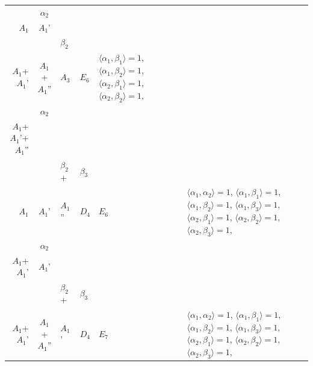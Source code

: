 \documentclass[12pt]{report}
\begin{document}
\begin{appendix}
{\begin{longtable}{rcl p{1cm}p{1cm}p{3cm} }
\begin{tabular}{cc}$\alpha_1$+ & $\alpha_2$\\\tiny{ $A_1$ } & \tiny{ $A_1$' }\end{tabular} &\begin{tabular}{c} = \\~ \end{tabular} & \begin{tabular}{cc}$\beta_1$+ & $\beta_2$\\\tiny{ $A_1$+$A_1$' } & \tiny{ $A_1$+$A_1$'' }\end{tabular} & $A_3$ & $E_6$ &  $\langle\alpha_1, \beta_1\rangle=1$, $\langle\alpha_1, \beta_2\rangle=1$, $\langle\alpha_2, \beta_1\rangle=1$, $\langle\alpha_2, \beta_2\rangle=1$, 
\\
\begin{tabular}{cc}$\alpha_1$+ & $\alpha_2$\\\tiny{ $A_1$+$A_1$'+$A_1$'' } & \tiny{  }\end{tabular} &\begin{tabular}{c} = \\~ \end{tabular} & \begin{tabular}{ccc}$\beta_1$+ & $\beta_2$+ & $\beta_3$\\\tiny{ $A_1$ } & \tiny{ $A_1$' } & \tiny{ $A_1$'' }\end{tabular} & $D_4$ & $E_6$ & $\langle\alpha_1, \alpha_2\rangle=1$,  $\langle\alpha_1, \beta_1\rangle=1$, $\langle\alpha_1, \beta_2\rangle=1$, $\langle\alpha_1, \beta_3\rangle=1$, $\langle\alpha_2, \beta_1\rangle=1$, $\langle\alpha_2, \beta_2\rangle=1$, $\langle\alpha_2, \beta_3\rangle=1$, 
\\
\begin{tabular}{cc}$\alpha_1$+ & $\alpha_2$\\\tiny{ $A_1$+$A_1$' } & \tiny{ $A_1$' }\end{tabular} &\begin{tabular}{c} = \\~ \end{tabular} & \begin{tabular}{ccc}$\beta_1$+ & $\beta_2$+ & $\beta_3$\\\tiny{ $A_1$+$A_1$' } & \tiny{ $A_1$+$A_1$'' } & \tiny{ $A_1$' }\end{tabular} & $D_4$ & $E_7$ & $\langle\alpha_1, \alpha_2\rangle=1$,  $\langle\alpha_1, \beta_1\rangle=1$, $\langle\alpha_1, \beta_2\rangle=1$, $\langle\alpha_1, \beta_3\rangle=1$, $\langle\alpha_2, \beta_1\rangle=1$, $\langle\alpha_2, \beta_2\rangle=1$, $\langle\alpha_2, \beta_3\rangle=1$, 

\end{longtable}}
\end{appendix}
\end{document}
